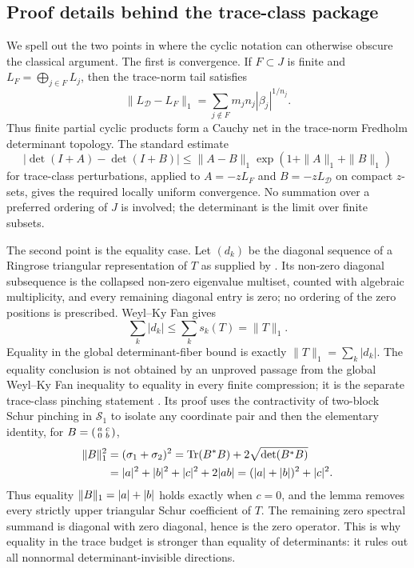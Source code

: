 \subsection{Proof details behind the trace-class package}

We spell out the two points in  where the
cyclic notation can otherwise obscure the classical argument.  The first is
convergence.  If \(F\subset J\) is finite and \(L_F=\bigoplus_{j\in F}L_j\),
then the trace-norm tail satisfies
\[
  \|L_{\mathcal D}-L_F\|_1
  =\sum_{j\notin F}m_jn_j|\beta_j|^{1/n_j}.
\]
Thus finite partial cyclic products form a Cauchy net in the trace-norm
Fredholm determinant topology.  The standard estimate
\[
  |\det(I+A)-\det(I+B)|
  \le \|A-B\|_1
      \exp(1+\|A\|_1+\|B\|_1)
\]
for trace-class perturbations, applied to \(A=-zL_F\) and
\(B=-zL_{\mathcal D}\) on compact \(z\)-sets, gives the required locally
uniform convergence.  No summation over a preferred ordering of \(J\) is
involved; the determinant is the limit over finite subsets.

The second point is the equality case.  Let \((d_k)\) be the diagonal sequence
of a Ringrose triangular representation of \(T\) as supplied by
.  Its non-zero diagonal subsequence is
the collapsed non-zero eigenvalue multiset, counted with algebraic
multiplicity, and every remaining diagonal entry is zero; no ordering of the
zero positions is prescribed.  Weyl--Ky Fan gives
\[
  \sum_k |d_k| \le \sum_k s_k(T)=\|T\|_1.
\]
Equality in the global determinant-fiber bound is exactly
\(\|T\|_1=\sum_k|d_k|\).  The equality conclusion is not obtained by an
unproved passage from the global Weyl--Ky Fan inequality to equality in every
finite compression; it is the separate trace-class pinching statement
.  Its proof uses the
contractivity of two-block Schur pinching in \(\mathcal S_1\) to isolate any
coordinate pair and then the elementary identity, for
\(B=\begin{psmallmatrix}a&c\\0&b\end{psmallmatrix}\),
\[
\begin{aligned}
  \|B\|_1^2
  &=(\sigma_1+\sigma_2)^2
    =\operatorname{Tr}(B^*B)+2\sqrt{\det(B^*B)} \\
  &=\lvert a \rvert^2+\lvert b \rvert^2+\lvert c \rvert^2+2\lvert ab \rvert
    =(\lvert a \rvert+\lvert b \rvert)^2+\lvert c \rvert^2 .
\end{aligned}
\]
Thus equality \(\|B\|_1=\lvert a \rvert+\lvert b \rvert\) holds exactly when \(c=0\), and the
lemma removes every strictly upper triangular Schur coefficient of \(T\).  The
remaining zero spectral summand is diagonal with zero diagonal, hence is the
zero operator.  This is why equality in the trace budget is stronger than
equality of determinants: it rules out all nonnormal determinant-invisible
directions.

